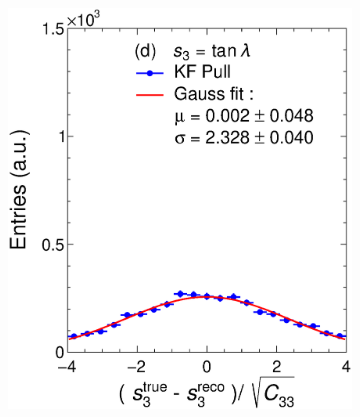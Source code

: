 \begin{figure}[t]
\begin{subfigure}{0.32\textwidth}
         \caption{}
         \label{fig:resp2KF_GArLite_NoCorr}
     \end{subfigure}
          \begin{subfigure}{0.32\textwidth}
         \centering
         \includegraphics[width=\textwidth]{figures/ch4-KF_NDGArLite/Toy/NoCorr/UnitKFEnd_p3.eps}
         \caption{}
         \label{fig:resp3KF_GArLite_NoCorr}
     \end{subfigure}
     \begin{subfigure}{0.32\textwidth}
         \centering

\end{subfigure}
\end{figure}

